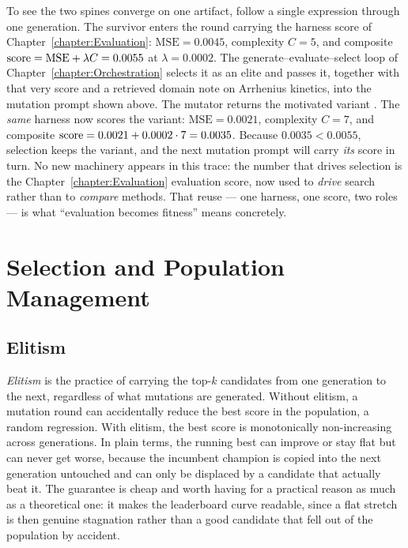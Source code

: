\begin{example}
To see the two spines converge on one artifact, follow a single expression through one generation.
The survivor  enters the round carrying the harness score of Chapter~\ref{chapter:Evaluation}: $\mathrm{MSE} = 0.0045$, complexity $C = 5$, and composite $\mathrm{score} = \mathrm{MSE} + \lambda C = 0.0055$ at $\lambda = 0.0002$.
The generate--evaluate--select loop of Chapter~\ref{chapter:Orchestration} selects it as an elite and passes it, together with that very score and a retrieved domain note on Arrhenius kinetics, into the mutation prompt shown above.
The mutator returns the motivated variant .
The \emph{same} harness now scores the variant: $\mathrm{MSE} = 0.0021$, complexity $C = 7$, and composite $\mathrm{score} = 0.0021 + 0.0002 \cdot 7 = 0.0035$.
Because $0.0035 < 0.0055$, selection keeps the variant, and the next mutation prompt will carry \emph{its} score in turn.
No new machinery appears in this trace: the number that drives selection is the Chapter~\ref{chapter:Evaluation} evaluation score, now used to \emph{drive} search rather than to \emph{compare} methods.
That reuse --- one harness, one score, two roles --- is what ``evaluation becomes fitness'' means concretely.
\end{example}

\section{Selection and Population Management}
\label{section:Selection}

\subsection{Elitism}

\emph{Elitism} is the practice of carrying the top-$k$ candidates from one generation to the next, regardless of what mutations are generated.
Without elitism, a mutation round can accidentally reduce the best score in the population, a random regression.
With elitism, the best score is monotonically non-increasing across generations.
In plain terms, the running best can improve or stay flat but can never get worse, because the incumbent champion is copied into the next generation untouched and can only be displaced by a candidate that actually beat it.
The guarantee is cheap and worth having for a practical reason as much as a theoretical one: it makes the leaderboard curve readable, since a flat stretch is then genuine stagnation rather than a good candidate that fell out of the population by accident.

